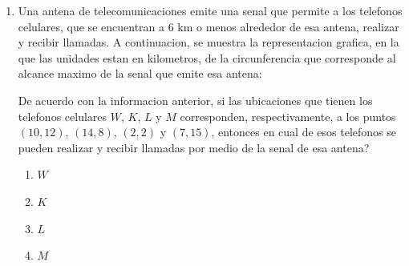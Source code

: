 \documentclass[12pt]{article}
\newcommand{\puntografico}{0.35}
\begin{document}
\begin{enumerate}[label=\textbf{\arabic*.}, itemsep=1.05cm]
De acuerdo con la informacion anterior, \textquestiondown cuales de esas rectas, que representan senderos, son perpendiculares entre si?

\begin{enumerate}[label=\Alph*)]
  \item $j$ y $k$.
  \item $h$ y $j$.
  \item $k$ y $n$.
  \item $j$ y $n$.
\end{enumerate}

\Needspace{0.92\textheight}
\item
Una antena de telecomunicaciones emite una senal que permite a los telefonos celulares, que se encuentran a $6$ km o menos alrededor de esa antena, realizar y recibir llamadas. A continuacion, se muestra la representacion grafica, en la que las unidades estan en kilometros, de la circunferencia que corresponde al alcance maximo de la senal que emite esa antena:

\begin{center}
\end{center}

De acuerdo con la informacion anterior, si las ubicaciones que tienen los telefonos celulares $W$, $K$, $L$ y $M$ corresponden, respectivamente, a los puntos $(10,12)$, $(14,8)$, $(2,2)$ y $(7,15)$, entonces \textquestiondown en cual de esos telefonos se pueden realizar y recibir llamadas por medio de la senal de esa antena?

\begin{enumerate}[label=\Alph*)]
  \item $W$
  \item $K$
  \item $L$
  \item $M$
\end{enumerate}

\end{enumerate}
\end{document}
